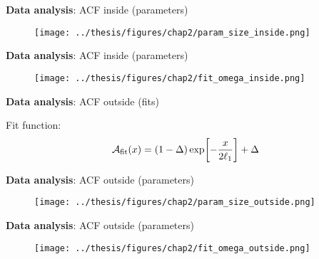 \documentclass[aspectratio=169]{beamer}
\begin{document}
\begin{frame}{\textbf{Data analysis}: ACF inside (parameters)}
  \begin{figure}
      \centering
      \texttt{[image: ../thesis/figures/chap2/param\_size\_inside.png]}
  \end{figure}
\end{frame}

\begin{frame}{\textbf{Data analysis}: ACF inside (parameters)}
  \begin{figure}
      \centering
      \texttt{[image: ../thesis/figures/chap2/fit\_omega\_inside.png]}
  \end{figure}
\end{frame}

\begin{frame}{\textbf{Data analysis}: ACF outside (fits)}
  \hspace{-0.05\textwidth}
  \begin{minipage}{0.47 \textwidth}
    \centering
  \end{minipage}
  \hspace{0.01\textwidth}
  \begin{minipage}{0.50 \textwidth}
      Fit function:
      \[
        \mathcal{A}_{\rm fit}(x) = (1-\Delta)\exp[-\frac{x}{2\ell_1}] + \Delta
      \]
  \end{minipage}
\end{frame}

\begin{frame}{\textbf{Data analysis}: ACF outside (parameters)}
  \begin{figure}
    \centering
    \texttt{[image: ../thesis/figures/chap2/param\_size\_outside.png]}
  \end{figure}
\end{frame}

\begin{frame}{\textbf{Data analysis}: ACF outside (parameters)}
  \begin{figure}
      \centering
      \texttt{[image: ../thesis/figures/chap2/fit\_omega\_outside.png]}
  \end{figure}
\end{frame}
\end{document}
